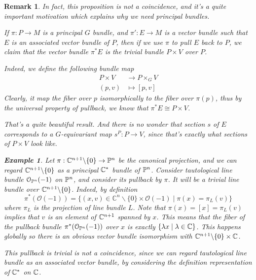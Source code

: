 \documentclass[11pt]{amsart}
\numberwithin{equation}{section}
\theoremstyle{plain}
\theoremstyle{plain}
\newtheorem{remksub}[thmsub]{Remark}
\newtheorem{exsub}[thmsub]{Example}
\numberwithin{equation}{section}
\begin{document}
\begin{remksub}\normalfont
In fact, this proposition is not a coincidence, and it's a quite important motivation which explains why we need principal bundles. 

If $\pi: P\to M$ is a principal $G$ bundle, and $\pi':E\to M$ is a vector bundle such that $E$ is an associated vector bundle of $P$, then if we use $\pi$ to pull $E$ back to $P$, we claim that the vector bundle $\pi^*E$ is the trivial bundle $P\times V$ over $P$.

Indeed, we define the following bundle map
$$
\begin{aligned}
P\times V&\to P\times_GV\\
(p,v)&\mapsto[p,v]
\end{aligned}
$$
Clearly, it map the fiber over $p$ isomorphically to the fiber over $\pi(p)$, thus by the universal property of pullback, we know that $\pi^*E\cong P\times V$.

That's a quite beautiful result. And there is no wonder that section $s$ of $E$ corresponds to a $G$-equivariant map $s^P:P\to V$, since that's exactly what sections of $P\times V$ look like.

\begin{exsub}\normalfont
Let $\pi:\Bbb{C}^{n+1}\backslash\{0\}\to\Bbb{P}^n$ be the canonical projection, and we can regard $\Bbb{C}^{n+1}\backslash\{0\}$ as a principal $\Bbb{C}^*$ bundle of $\Bbb{P}^n$. Consider tautological line bundle $\mathcal{O}_{\Bbb{P}^n}(-1)$ on $\Bbb{P}^n$, and consider its pullback by $\pi$. It will be a trivial line bundle over $\Bbb{C}^{n+1}\backslash\{0\}$. Indeed, by definition
$$
\pi^{*}(\mathcal{O}(-1))=\{(x, v) \in \mathbb{C}^{n} \backslash\{0\} \times \mathcal{O}(-1) \mid \pi(x)=\pi_{L}(v)\}
$$
where $\pi_L$ is the projection of line bundle $L$. Note that $\pi(x)=[x]=\pi_L(v)$ implies that $v$ is an element of $\Bbb{C}^{n+1}$ spanned by $x$. This means that the fiber of the pullback bundle $\pi^*(\mathcal{O}_{\Bbb{P}^n}(-1))$ over $x$ is exactly $\{\lambda x\mid \lambda\in\Bbb{C}\}$. This happens globally so there is an obvious vector bundle isomorphism with $\Bbb{C}^{n+1}\backslash\{0\}\times\Bbb{C}$.

This pullback is trivial is not a coincidence, since we can regard tautological line bundle as an associated vector bundle, by considering the definition representation of $\Bbb{C}^*$ on $\Bbb{C}$.
\end{exsub}
\end{remksub}
\end{document}
